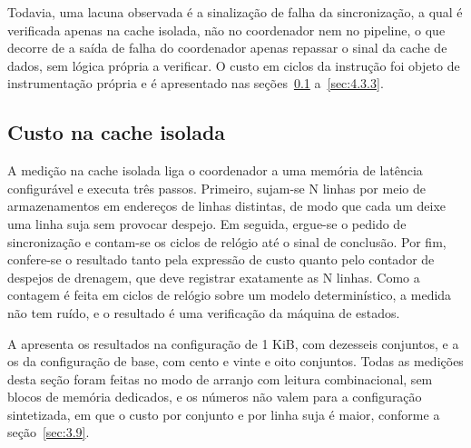 Todavia, uma lacuna observada é a sinalização de falha da sincronização, a qual é verificada apenas na cache isolada, não no coordenador nem no pipeline, o que decorre de a saída de falha do coordenador apenas repassar o sinal da cache de dados, sem lógica própria a verificar. O custo em ciclos da instrução foi objeto de instrumentação própria e é apresentado nas seções~\ref{sec:4.3.1} a~\ref{sec:4.3.3}.

\subsection{Custo na cache isolada}\label{sec:4.3.1}

A medição na cache isolada liga o coordenador a uma memória de latência configurável e executa três passos. Primeiro, sujam-se N linhas por meio de armazenamentos em endereços de linhas distintas, de modo que cada um deixe uma linha suja sem provocar despejo. Em seguida, ergue-se o pedido de sincronização e contam-se os ciclos de relógio até o sinal de conclusão. Por fim, confere-se o resultado tanto pela expressão de custo quanto pelo contador de despejos de drenagem, que deve registrar exatamente as N linhas. Como a contagem é feita em ciclos de relógio sobre um modelo determinístico, a medida não tem ruído, e o resultado é uma verificação da máquina de estados.

A  apresenta os resultados na configuração de 1 KiB, com dezesseis conjuntos, e a  os da configuração de base, com cento e vinte e oito conjuntos. Todas as medições desta seção foram feitas no modo de arranjo com leitura combinacional, sem blocos de memória dedicados, e os números não valem para a configuração sintetizada, em que o custo por conjunto e por linha suja é maior, conforme a seção~\ref{sec:3.9}.

